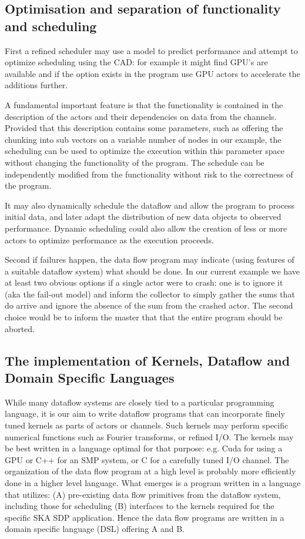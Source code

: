 \documentclass[11pt,a4paper]{article}
\begin{document}
\subsection{Optimisation and separation of functionality and scheduling}

First a refined scheduler may use a model to predict performance and attempt to optimize scheduling using the CAD: for example it might find GPU’s are available and if the option exists in the program use GPU actors to accelerate the additions further.    

A fundamental important feature is that the functionality is contained in the description of the actors and their dependencies on data from the channels.  Provided that this description contains some parameters, such as offering the chunking into sub vectors on a variable number of nodes in our example, the scheduling can be used to optimize the execution within this parameter space without changing the functionality of the program.  The schedule can be independently modified from the functionality without risk to the correctness of the program.

It may also dynamically schedule the dataflow and allow the program to process initial data, and later adapt the distribution of new data objects to observed performance.  Dynamic scheduling could also allow the creation of less or more actors to optimize performance as the execution proceeds. 

Second if failures happen, the data flow program may indicate (using features of a suitable dataflow system) what should be done.   In our current example we have at least two obvious options if a single actor were to crash: one is to ignore it (aka the fail-out model) and inform the collector to simply gather the sums that do arrive and ignore the absence of the sum from the crashed actor.  The second choice would be to inform the master that that the entire program should be aborted.

\subsection{The implementation of Kernels, Dataflow and Domain Specific Languages}

While many dataflow systems are closely tied to a particular programming language, it is our aim to write dataflow programs that can incorporate finely tuned kernels as parts of actors or channels.  Such kernels may perform specific numerical functions such as Fourier transforms, or refined I/O. The kernels may be best written in a language optimal for that purpose: e.g. Cuda for using a GPU or C++ for an SMP system, or C for a carefully tuned I/O channel. 
The organization of the data flow program at a high level is probably more efficiently done in a higher level language.
What emerges is a program written in a language that utilizes:
(A) pre-existing data flow primitives from the dataflow system, including those for scheduling
(B) interfaces to the kernels required for the specific SKA SDP application.
Hence the data flow programs are written in a domain specific language (DSL) offering A and B. 
\end{document}
